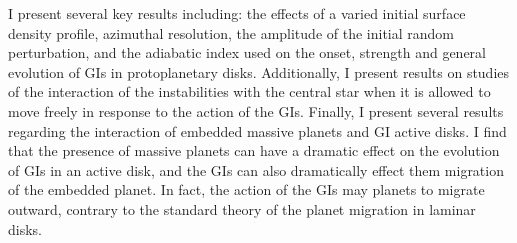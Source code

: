 \begin{spacing}{1.66}
\begin{spacing}{1.24}
I present several key results including: the effects of a varied initial surface density profile, azimuthal resolution, the amplitude of the initial random perturbation, and the adiabatic index used on the onset, strength and general evolution of GIs in protoplanetary disks. Additionally, I present results on studies of the interaction of the instabilities with the central star when it is allowed to move freely in response to the action of the GIs. Finally, I present several results regarding the interaction of embedded massive planets and GI active disks. I find that the presence of massive planets can have a dramatic effect on the evolution of GIs in an active disk, and the GIs can also dramatically effect them migration of the embedded planet. In fact, the action of the GIs may planets to migrate outward, contrary to the standard theory of the planet migration in laminar disks.
\end{spacing}


\vspace{0.3125in}

\begin{spacing}{1}
\noindent
\hbox{\hspace{2.5in} \underbar{\hbox{\hspace{3.25in}}}} \\

\vspace{0.0125in}

\noindent
\hbox{\hspace{2.5in} \underbar{\hbox{\hspace{3.25in}}}} \\

\vspace{0.0125in}

\noindent
\hbox{\hspace{2.5in} \underbar{\hbox{\hspace{3.25in}}}} \\

\vspace{0.0125in}

\noindent
\hbox{\hspace{2.5in} \underbar{\hbox{\hspace{3.25in}}}} \\
\end{spacing}

\clearpage



\begin{spacing}{1.24}

\tableofcontents
\listoffigures
\listoftables

\end{spacing}

\clearpage


\end{spacing}
